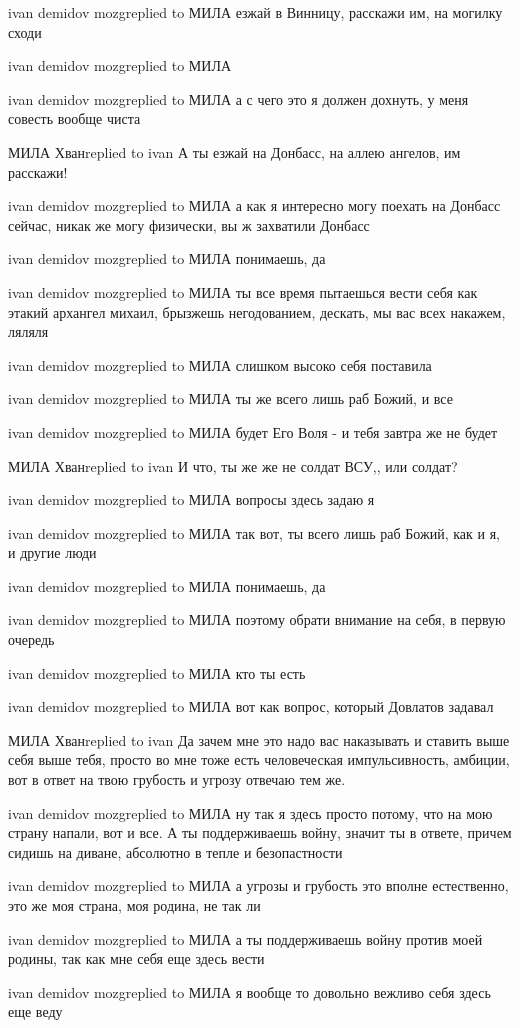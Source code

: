 ivan demidov mozgreplied to МИЛА
езжай в Винницу, расскажи им, на могилку сходи

ivan demidov mozgreplied to МИЛА

ivan demidov mozgreplied to МИЛА
а с чего это я должен дохнуть, у меня совесть вообще чиста

МИЛА Хванreplied to ivan
А ты езжай на Донбасс, на аллею ангелов, им расскажи!

ivan demidov mozgreplied to МИЛА
а как я интересно могу поехать на Донбасс сейчас, никак же могу физически, вы ж захватили Донбасс

ivan demidov mozgreplied to МИЛА
понимаешь, да

ivan demidov mozgreplied to МИЛА
ты все время пытаешься вести себя как этакий архангел михаил, брызжешь негодованием, дескать, мы вас всех накажем, ляляля

ivan demidov mozgreplied to МИЛА
слишком высоко себя поставила

ivan demidov mozgreplied to МИЛА
ты же всего лишь раб Божий, и все

ivan demidov mozgreplied to МИЛА
будет Его Воля - и тебя завтра же не будет

МИЛА Хванreplied to ivan
И что, ты же же не солдат ВСУ,, или солдат?

ivan demidov mozgreplied to МИЛА
вопросы здесь задаю я

ivan demidov mozgreplied to МИЛА
так вот, ты всего лишь раб Божий, как и я, и другие люди

ivan demidov mozgreplied to МИЛА
понимаешь, да

ivan demidov mozgreplied to МИЛА
поэтому обрати внимание на себя, в первую очередь

ivan demidov mozgreplied to МИЛА
кто ты есть

ivan demidov mozgreplied to МИЛА
вот как вопрос, который Довлатов задавал

МИЛА Хванreplied to ivan
Да зачем мне это надо вас наказывать и ставить выше себя выше тебя, просто во мне тоже есть человеческая импульсивность, амбиции, вот в ответ на твою грубость и угрозу отвечаю тем же.

ivan demidov mozgreplied to МИЛА
ну так я здесь просто потому, что на мою страну напали, вот и все. А ты поддерживаешь войну, значит ты в ответе, причем сидишь на диване, абсолютно в тепле и безопастности

ivan demidov mozgreplied to МИЛА
а угрозы и грубость это вполне естественно, это же моя страна, моя родина, не так ли

ivan demidov mozgreplied to МИЛА
а ты поддерживаешь войну против моей родины, так как мне себя еще здесь вести

ivan demidov mozgreplied to МИЛА
я вообще то довольно вежливо себя здесь еще веду


